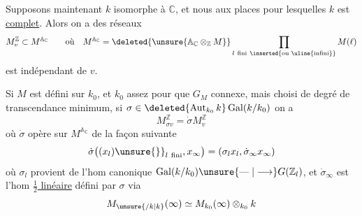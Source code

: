 Supposons maintenant $k$ isomorphe à $\mathbb C$, et  nous aux places pour lesquelles $k$ est \uline{complet}. Alors on a des réseaux
\[
M_v^{\mathbb Z}\subset M^{\mathbb A_{\mathbb C}}\qquad\text{où}\quad M^{\mathbb A_{\mathbb C}}=\deleted{\unsure{\mathbb A_{\mathbb C}\otimes_{\mathbb Z}M}}\prod_{l\ \mathrm{fini}\ \inserted{\text{ou }\uline{\text{infini}}}} M(\ell)
\]
est indépendant de $v$.


Si $M$ est défini sur  $k_0$, et $k_0$ assez  pour que $G_M$ connexe, mais choisi de degré de transcendance minimum,     si $\sigma\in\deleted{\operatorname{Aut}_{k_0}k}\operatorname{Gal}(k/k_0)$
on a
\[
M_{\sigma v}^{\mathbb Z}=\dot{\sigma}M_v^{\mathbb Z}
\]
où $\dot{\sigma}$ opère sur $M^{\mathbb A_{\mathbb C}}$   de la façon suivante
\[
\dot{\sigma}\bigl((x_l)\unsure{\}}_{l\ \mathrm{fini}},x_\infty\bigr)=(\sigma_l x_l,\dot{\sigma}_\infty x_\infty)
\]
où $\sigma_l$ provient de l'hom canonique $\operatorname{Gal}(k/k_0)\unsure{\mathrel{\text{---}}|\longrightarrow}G(\mathbb Z_l)$, et $\dot{\sigma}_\infty$ est l'hom \uline{$\frac12$ linéaire} défini par $\sigma$ via
\[
M_{\unsure{/k|k}}(\infty)\simeq M_{k_0}(\infty)\otimes_{k_0} k
\]
